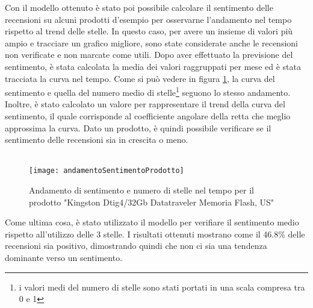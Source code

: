 Con il modello ottenuto è stato poi possibile calcolare il sentimento delle recensioni su alcuni prodotti d'esempio per osservarne l'andamento nel tempo rispetto al trend delle stelle. In questo caso, per avere un insieme di valori più ampio e tracciare un grafico migliore, sono state considerate anche le recensioni non verificate e non marcate come utili. Dopo aver effettuato la previsione del sentimento, è stata calcolata la media dei valori raggruppati per mese ed è stata tracciata la curva nel tempo. Come si può vedere in figura \ref{fig:andamentoSentimentoProdotto}, la curva del sentimento e quella del numero medio di stelle\footnote{i valori medi del numero di stelle sono stati portati in una scala compresa tra 0 e 1} seguono lo stesso andamento. Inoltre, è stato calcolato un valore per rappresentare il trend della curva del sentimento, il quale corrisponde al coefficiente angolare della retta che meglio approssima la curva. Dato un prodotto, è quindi possibile verificare se il sentimento delle recensioni sia in crescita o meno. \\\\

\begin{figure}[H]
    \texttt{[image: andamentoSentimentoProdotto]}\centering
    \caption{Andamento di sentimento e numero di stelle nel tempo per il prodotto "Kingston Dtig4/32Gb Datatraveler Memoria Flash, US"}\label{fig:andamentoSentimentoProdotto}
\end{figure}

Come ultima cosa, è stato utilizzato il modello per verifiare il sentimento medio rispetto all'utilizzo delle 3 stelle. I risultati ottenuti mostrano come il 46.8\% delle recensioni sia positivo, dimostrando quindi che non ci sia una tendenza dominante verso un sentimento.


